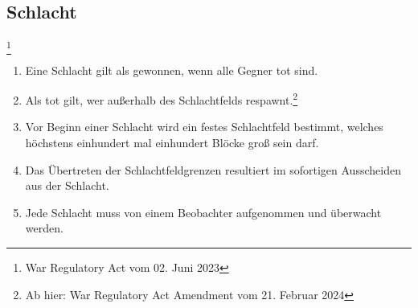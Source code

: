 \documentclass{article}
\begin{document}
\subsection{Schlacht}\footnote{War Regulatory Act vom 02. Juni 2023}
\begin{enumerate}[(1)]
	\item Eine Schlacht gilt als gewonnen, wenn alle Gegner tot sind.
	\item Als tot gilt, wer außerhalb des Schlachtfelds respawnt.\footnote{Ab hier: War Regulatory Act Amendment vom 21. Februar 2024}
	\item Vor Beginn einer Schlacht wird ein festes Schlachtfeld bestimmt, welches höchstens einhundert mal einhundert Blöcke groß sein darf.
	\item Das Übertreten der Schlachtfeldgrenzen resultiert im sofortigen Ausscheiden aus der Schlacht.
	\item Jede Schlacht muss von einem Beobachter aufgenommen und überwacht werden.
\end{enumerate}
\end{document}
